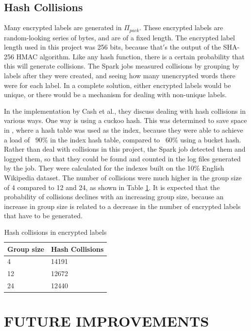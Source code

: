 \documentclass{sig-alternate-05-2015}
\begin{document}
\subsection{Hash Collisions}
Many encrypted labels are generated in $\Pi_{pack}$. These encrypted labels are random-looking series of bytes, and are of a fixed length. The encrypted label length used in this project was 256 bits, because that$'$s the output of the SHA-256 HMAC algorithm. Like any hash function, there is a certain probability that this will generate collisions. The Spark jobs measured collisions by grouping by labels after they were created, and seeing how many unencrypted words there were for each label. In a complete solution, either encrypted labels would be unique, or there would be a mechanism for dealing with non-unique labels.

In the implementation by Cash et al., they discuss dealing with hash collisions in various ways. One way is using a cuckoo hash. This was determined to save space in \cite{davidcashetal.2014}, where a hash table was used as the index, because they were able to achieve a load of ~90\% in the index hash table, compared to ~60\% using a bucket hash. Rather than deal with collisions in this project, the Spark job detected them and logged them, so that they could be found and counted in the log files generated by the job. They were calculated for the indexes built on the 10\% English Wikipedia dataset. The number of collisions were much higher in the group size of 4 compared to 12 and 24, as shown in Table \ref{hash-collisions}. It is expected that the probability of collisions declines with an increasing group size, because an increase in group size is related to a decrease in the number of encrypted labels that have to be generated.

\begin{table}[]
\centering
\caption{Hash collisions in encrypted labels}
\label{hash-collisions}
\begin{tabular}{ll}
\hline
Group size & Hash Collisions \\ \hline
4          & 14191           \\
12         & 12672           \\
24         & 12440           \\ \hline
\end{tabular}
\end{table}

\section{FUTURE IMPROVEMENTS}
\end{document}
